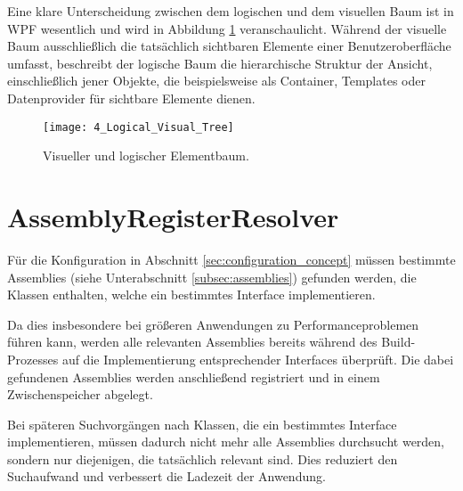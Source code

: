 Eine klare Unterscheidung zwischen dem logischen und dem visuellen Baum ist in WPF \cite{microsoft_trees_in_wpf} wesentlich und wird in Abbildung \ref{fig:logical_visual_tree} veranschaulicht. Während der visuelle Baum ausschließlich die tatsächlich sichtbaren Elemente einer Benutzeroberfläche umfasst, beschreibt der logische Baum die hierarchische Struktur der Ansicht, einschließlich jener Objekte, die beispielsweise als Container, Templates oder Datenprovider für sichtbare Elemente dienen.

\begin{figure}[H]
    \centering
    \texttt{[image: 4\_Logical\_Visual\_Tree]}
    \caption{Visueller und logischer Elementbaum.}
    \label{fig:logical_visual_tree}
\end{figure}

\section{AssemblyRegisterResolver}
\label{sec:assembly_resolver}
Für die Konfiguration in Abschnitt \ref{sec:configuration_concept} müssen bestimmte Assemblies (siehe Unterabschnitt \ref{subsec:assemblies}) gefunden werden, die Klassen enthalten, welche ein bestimmtes Interface implementieren.

Da dies insbesondere bei größeren Anwendungen zu Performanceproblemen führen kann, werden alle relevanten Assemblies bereits während des Build-Prozesses auf die Implementierung entsprechender Interfaces überprüft. Die dabei gefundenen Assemblies werden anschließend registriert und in einem Zwischenspeicher abgelegt.

Bei späteren Suchvorgängen nach Klassen, die ein bestimmtes Interface implementieren, müssen dadurch nicht mehr alle Assemblies durchsucht werden, sondern nur diejenigen, die tatsächlich relevant sind. Dies reduziert den Suchaufwand und verbessert die Ladezeit der Anwendung.